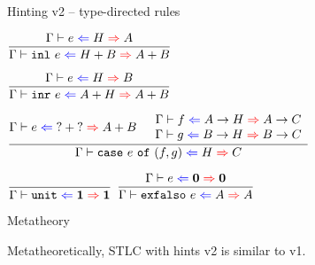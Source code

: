 \documentclass{beamer}
\newcommand{\Fun}[2]{#1 \to #2}
\newcommand{\Sum}[2]{#1 + #2}
\newcommand{\Unit}{\textbf{1}}
\newcommand{\Empty}{\textbf{0}}
\newcommand{\inl}[1][]{\texttt{inl}\ #1}
\newcommand{\inr}[1][]{\texttt{inr}\ #1}
\newcommand{\case}[3]{\texttt{case}\ #1\ \texttt{of}\ (#2, #3)}
\newcommand{\unit}{\texttt{unit}}
\newcommand{\exfalso}[1][]{\texttt{exfalso}\ #1}
\newcommand{\infrule}[3][]{\displaystyle \frac{#2}{#3} \textsc{\footnotesize{#1}}}
\begin{document}
\begin{frame}{Hinting v2 -- type-directed rules}

\begin{center}
  $\infrule{\hinting{e}{H}{A}}{\hinting{\inl[e]}{\Sum{H}{B}}{\Sum{A}{B}}}$

  \vspace{2em}

  $\infrule{\hinting{e}{H}{B}}{\hinting{\inr[e]}{\Sum{A}{H}}{\Sum{A}{B}}}$

  \vspace{2em}

  $\infrule{\hinting{e}{\Sum{\Hint}{\Hint}}{\Sum{A}{B}} \quad \begin{array}{c} \hinting{f}{\Fun{A}{H}}{\Fun{A}{C}} \\ \hinting{g}{\Fun{B}{H}}{\Fun{B}{C}} \end{array}}{\hinting{\case{e}{f}{g}}{H}{C}}$

  \vspace{2em}

  $\infrule{}{\hinting{\unit}{\Unit}{\Unit}}$ \quad
  $\infrule{\hinting{e}{\Empty}{\Empty}}{\hinting{\exfalso[e]}{A}{A}}$
\end{center}

\end{frame}

\begin{frame}{Metatheory}

Metatheoretically, STLC with hints v2 is similar to v1.

\end{frame}
\end{document}
